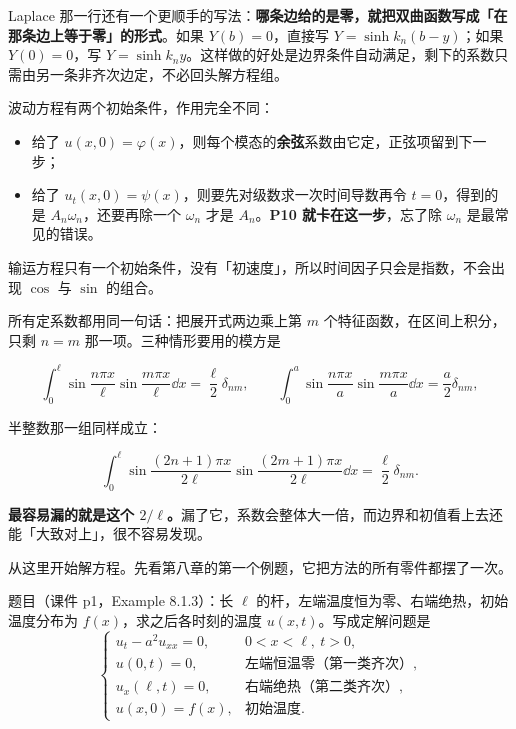 Laplace 那一行还有一个更顺手的写法：\textbf{哪条边给的是零，就把双曲函数写成「在那条边上等于零」的形式}。如果 $Y(b)=0$，直接写 $Y=\sinh k_n(b-y)$；如果 $Y(0)=0$，写 $Y=\sinh k_ny$。这样做的好处是边界条件自动满足，剩下的系数只需由另一条非齐次边定，不必回头解方程组。


波动方程有两个初始条件，作用完全不同：

\begin{itemize}
  \item 给了 $u(x,0)=\varphi(x)$，则每个模态的\textbf{余弦}系数由它定，正弦项留到下一步；
  \item 给了 $u_t(x,0)=\psi(x)$，则要先对级数求一次时间导数再令 $t=0$，得到的是 $A_n\omega_n$，还要再除一个 $\omega_n$ 才是 $A_n$。\textbf{P10 就卡在这一步}，忘了除 $\omega_n$ 是最常见的错误。
\end{itemize}

输运方程只有一个初始条件，没有「初速度」，所以时间因子只会是指数，不会出现 $\cos$ 与 $\sin$ 的组合。


所有定系数都用同一句话：把展开式两边乘上第 $m$ 个特征函数，在区间上积分，只剩 $n=m$ 那一项。三种情形要用的模方是

\[
\int_0^{\ell}\sin\frac{n\pi x}{\ell}\sin\frac{m\pi x}{\ell}\dd x=\frac{\ell}{2}\delta_{nm},
\qquad
\int_0^{a}\sin\frac{n\pi x}{a}\sin\frac{m\pi x}{a}\dd x=\frac{a}{2}\delta_{nm},
\]

半整数那一组同样成立：

\[
\int_0^{\ell}\sin\frac{(2n+1)\pi x}{2\ell}\sin\frac{(2m+1)\pi x}{2\ell}\dd x=\frac{\ell}{2}\delta_{nm}.
\]

\textbf{最容易漏的就是这个 $2/\ell$。}漏了它，系数会整体大一倍，而边界和初值看上去还能「大致对上」，很不容易发现。




从这里开始解方程。先看第八章的第一个例题，它把方法的所有零件都摆了一次。


题目（课件 p1，Example 8.1.3）：长 $\ell$ 的杆，左端温度恒为零、右端绝热，初始温度分布为 $f(x)$，求之后各时刻的温度 $u(x,t)$。写成定解问题是
\begin{equation}
  \begin{cases}
    u_t-a^2u_{xx}=0, & 0<x<\ell,\ t>0,\\
    u(0,t)=0, & \text{左端恒温零（第一类齐次）},\\
    u_x(\ell,t)=0, & \text{右端绝热（第二类齐次）},\\
    u(x,0)=f(x), & \text{初始温度}.
  \end{cases}
\end{equation}

